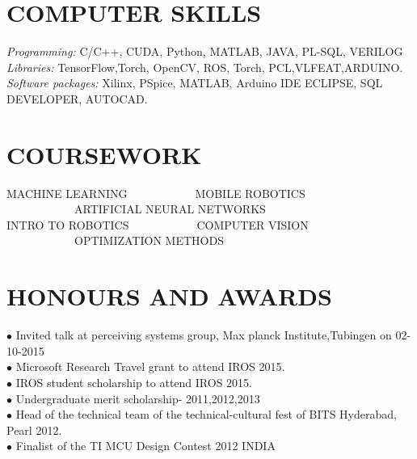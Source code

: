 \documentclass[a4paper,10pt]{article}
\begin{document}
\section{COMPUTER SKILLS} 
{\sl Programming:}        C/C++, CUDA, Python, MATLAB, JAVA, PL-SQL, VERILOG\\
{\sl Libraries:        }      TensorFlow,Torch, OpenCV, ROS, Torch, PCL,VLFEAT,ARDUINO.\\
{\sl Software packages: }Xilinx, PSpice, MATLAB, Arduino IDE
                       ECLIPSE, SQL DEVELOPER, AUTOCAD.\\
 
\section{COURSEWORK}
MACHINE LEARNING\ \ \ \ \ \ \ \ \ \ \ \  MOBILE ROBOTICS \ \ \ \ \ \ \  \ \ \ \ \ ARTIFICIAL NEURAL NETWORKS \\  INTRO TO ROBOTICS\ \ \ \ \ \ \ \ \ \ \ \ COMPUTER VISION \ \ \ \  \ \ \ \ \ \ \ \   OPTIMIZATION METHODS\\



\section{HONOURS AND AWARDS}
$\bullet$  Invited talk at perceiving systems group, Max planck Institute,Tubingen on 02-10-2015\\
$\bullet$  Microsoft Research Travel grant to attend IROS 2015.\\
$\bullet$ IROS student scholarship to attend IROS 2015.\\
$\bullet$  Undergraduate merit scholarship- 2011,2012,2013\\
$\bullet$ Head of the technical team of the technical-cultural fest of BITS Hyderabad, Pearl 2012.\\
$\bullet$  Finalist of the TI MCU Design Contest 2012 INDIA \\
\end{document}
